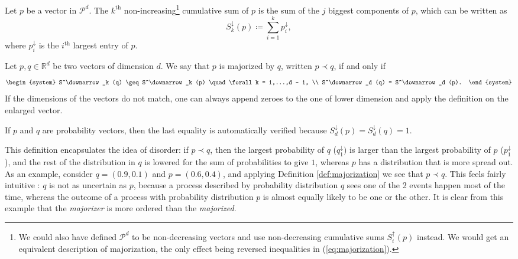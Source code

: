 \begin{definition}[Cumulative sum] %
    Let $p$ be a vector in $\mathcal{P}^d$. The $k^{\text{th}}$ non-increasing\footnote{We could also have defined $\mathcal{P}^d$ to be non-decreasing vectors and use non-decreasing cumulative sums $S^\uparrow_i (p)$ instead. We would get an equivalent description of majorization, the only effect being reversed inequalities in (\ref{eq:majorization}).} cumulative sum of $p$ is the sum of the $j$ biggest components of $p$, which can be written as
    \begin{equation}
        S^\downarrow_k (p) \coloneqq \sum_{i = 1}^{k} p^\downarrow_i,
    \end{equation}
    where $p^\downarrow_i$ is the $i^{\text{th}}$ largest entry of $p$. 
\end{definition}

\begin{definition} \label{def:majorization}
    Let $p, q \in \mathbb{R}^d$ be two vectors of dimension $d$. We say that $p$ is majorized by $q$, written $p \prec q$, if and only if
    \begin{equation} \label{eq:majorization}
        \begin{system}
            S^\downarrow_k (q) \geq S^\downarrow_k (p) \quad \forall k = 1,...,d - 1, \\
            S^\downarrow_d (q) = S^\downarrow_d (p).
        \end{system}
    \end{equation}
If the dimensions of the vectors do not match, one can always append zeroes to the one of lower dimension and apply the definition on the enlarged vector.
\end{definition}

\begin{remark}
    If $p$ and $q$ are probability vectors, then the last equality is automatically verified because $S^\downarrow_d (p) = S^\downarrow_d (q) = 1$.
\end{remark}

This definition encapsulates the idea of disorder: if $p \prec q$, then the largest probability of $q$ ($q_1^\downarrow)$ is larger than the largest probability of $p$ ($p_1^\downarrow$), and the rest of the distribution in $q$ is lowered for the sum of probabilities to give $1$, whereas $p$ has a distribution that is more spread out. As an example, consider $q = (0.9, 0.1)$ and $p = (0.6, 0.4)$, and applying Definition \ref{def:majorization} we see that $p \prec q$. This feels fairly intuitive : $q$ is not as uncertain as $p$, because a process described by probability distribution $q$ sees one of the 2 events happen most of the time, whereas the outcome of a process with probability distribution $p$ is almost equally likely to be one or the other. It is clear from this example that the \textit{majorizer} is more ordered than the \textit{majorized}.

